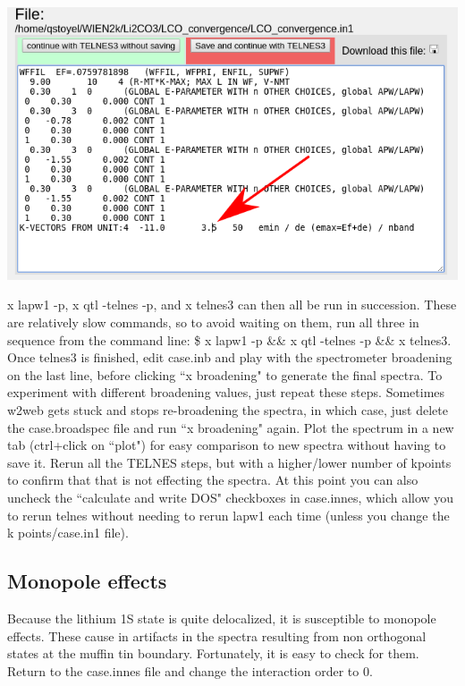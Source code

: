 \documentclass[12pt]{article}
\begin{document}
\includegraphics[scale=0.4]{./images/in1_edit.png}

x lapw1 -p, x qtl -telnes -p, and x telnes3 can then all be run in succession.  These are relatively slow commands, so to avoid waiting on them, run all three in sequence from the command line: \$ x lapw1 -p \&\& x qtl -telnes -p \&\& x telnes3.\\

Once telnes3 is finished, edit case.inb and play with the spectrometer broadening on the last line, before clicking ``x broadening" to generate the final spectra. To experiment with different broadening values, just repeat these steps.  Sometimes w2web gets stuck and stops re-broadening the spectra, in which case, just delete the case.broadspec file and run ``x broadening" again.   Plot the spectrum in a new tab (ctrl+click on ``plot") for easy comparison to new spectra without having to save it. Rerun all the TELNES steps, but with a higher/lower number of kpoints to confirm that that is not effecting the spectra. At this point you can also uncheck the ``calculate and write DOS" checkboxes in case.innes, which allow you to rerun telnes without needing to rerun lapw1 each time (unless you change the k points/case.in1 file).  \\

\subsection{Monopole effects}
Because the lithium 1S state is quite delocalized, it is susceptible to monopole effects.  These cause in artifacts in the spectra resulting from non orthogonal states at the muffin tin boundary.  Fortunately, it is easy to check for them.  Return to the case.innes file and change the interaction order to 0. \\
\end{document}
